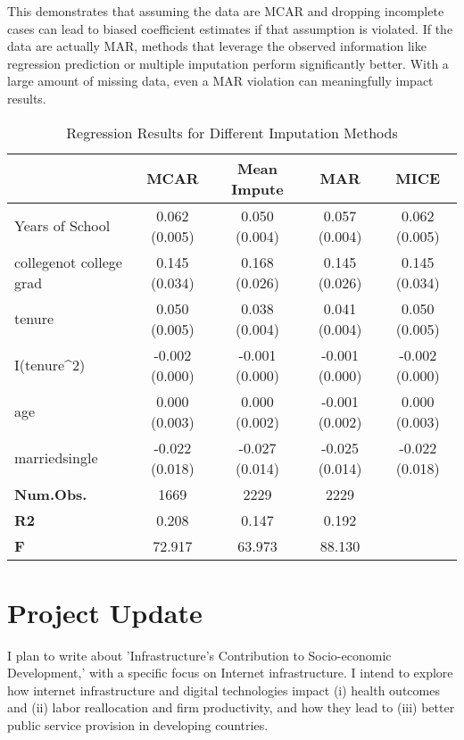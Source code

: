 \documentclass{article}
\begin{document}
This demonstrates that assuming the data are MCAR and dropping incomplete cases can lead to biased coefficient estimates if that assumption is violated. If the data are actually MAR, methods that leverage the observed information like regression prediction or multiple imputation perform significantly better. With a large amount of missing data, even a MAR violation can meaningfully impact results.

\begin{table}[htbp]
\centering
\caption{Regression Results for Different Imputation Methods}
\begin{tabular}{lcccc}
\toprule\toprule
  & \textbf{MCAR} & \textbf{Mean Impute} & \textbf{MAR} & \textbf{MICE}\\
\midrule
Years of School & 0.062 (0.005) & 0.050 (0.004) & 0.057 (0.004) & 0.062 (0.005)\\
collegenot college grad & 0.145 (0.034) & 0.168 (0.026) & 0.145 (0.026) & 0.145 (0.034)\\
tenure & 0.050 (0.005) & 0.038 (0.004) & 0.041 (0.004) & 0.050 (0.005)\\
I(tenure\textasciicircum{}2) & -0.002 (0.000) & -0.001 (0.000) & -0.001 (0.000) & -0.002 (0.000)\\
age & 0.000 (0.003) & 0.000 (0.002) & -0.001 (0.002) & 0.000 (0.003)\\
marriedsingle & -0.022 (0.018) & -0.027 (0.014) & -0.025 (0.014) & -0.022 (0.018)\\
\midrule
\textbf{Num.Obs.} & 1669 & 2229 & 2229 & \\
\textbf{R2} & 0.208 & 0.147 & 0.192 & \\
\textbf{F} & 72.917 & 63.973 & 88.130 & \\
\bottomrule \bottomrule
\end{tabular}
\end{table}





\section{Project Update} 
I plan to write about 'Infrastructure's Contribution to Socio-economic Development,' with a specific focus on Internet infrastructure. I intend to explore how internet infrastructure and digital technologies impact (i) health outcomes and (ii) labor reallocation and firm productivity, and how they lead to (iii) better public service provision in developing countries.
\end{document}
